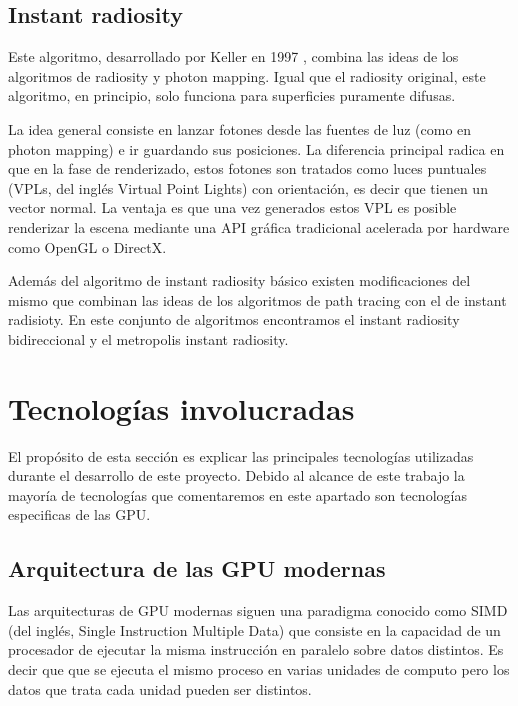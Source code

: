 \subsection{Instant radiosity}

Este algoritmo, desarrollado por Keller en 1997 \nocite{Keller1997}, combina las ideas de los algoritmos de radiosity y photon mapping. Igual que el radiosity original, este algoritmo, en principio, solo funciona para superficies puramente difusas.

\medskip
La idea general consiste en lanzar fotones desde las fuentes de luz (como en photon mapping) e ir guardando sus posiciones. La diferencia principal radica en que en la fase de renderizado, estos fotones son tratados como luces puntuales (VPLs, del inglés Virtual Point Lights) con orientación, es decir que tienen un vector normal. La ventaja es que una vez generados estos VPL es posible renderizar la escena mediante una API gráfica tradicional acelerada por hardware como OpenGL o DirectX.

\medskip

Además del algoritmo de instant radiosity básico existen modificaciones del mismo que combinan las ideas de los algoritmos de path tracing con el de instant radisioty. En este conjunto de algoritmos encontramos el instant radiosity bidireccional y el metropolis instant radiosity.  


\clearpage

\section{Tecnologías involucradas}

El propósito de esta sección es explicar las principales tecnologías utilizadas durante el desarrollo de este proyecto. Debido al alcance de este trabajo la mayoría de tecnologías que comentaremos en este apartado son tecnologías especificas de las GPU.

\subsection{Arquitectura de las GPU modernas}

Las arquitecturas de GPU modernas siguen una paradigma conocido como SIMD (del inglés, Single Instruction Multiple Data) que consiste en la capacidad de un procesador de ejecutar la misma instrucción en paralelo sobre datos distintos. Es decir que que se ejecuta el mismo proceso en varias unidades de computo pero los datos que trata cada unidad pueden ser distintos.


